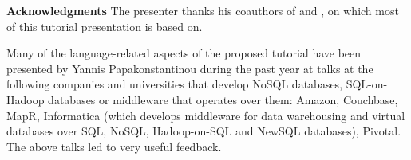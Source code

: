 \noindent \textbf{Acknowledgments} 
The presenter thanks his coauthors of \cite{sqlpp-extended-corr-2015} and \cite{sqlpp-survey-2015}, on which most of this tutorial presentation is based on.

Many of the language-related aspects of the proposed tutorial have been presented by Yannis Papakonstantinou during the past year at talks at the following companies and universities that develop NoSQL databases,  SQL-on-Hadoop databases or middleware that operates over them: Amazon, Couchbase, MapR, Informatica (which develops middleware for data warehousing and virtual databases over SQL, NoSQL, Hadoop-on-SQL and NewSQL databases), Pivotal. The above talks led to very useful feedback.
